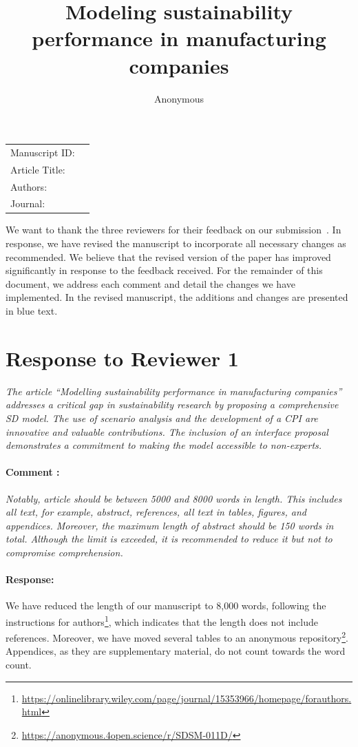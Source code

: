 \documentclass[11pt]{article}
\title{Modeling sustainability performance in manufacturing companies}
\author{Anonymous}
\newcommand{\pid}{}
\newcommand{\jrn}{}
\def\maketitle{
    {\flushleft
    \begin{tabularx}{\dimexpr\textwidth}{lX}
    Manuscript ID:	& \pid \\
    Article Title:	& \thetitle \\
    Authors:		& \theauthor \\
    Journal:		& \jrn \\
    \end{tabularx}}
	\vspace{1em}
}
\newcommand{\ReviewerComment}[1]{\paragraph*{Comment \stepcounter{NumComment}\arabic{NumComment}:} \textit{#1}}
\newcommand{\AuthorResponse}{\paragraph*{Response:}}
\begin{document}
	

	\maketitle
	
    We want to thank the three reviewers for their feedback on our submission~\pid. In response, we have revised the manuscript to incorporate all necessary changes as recommended. We believe that the revised version of the paper has improved significantly in response to the feedback received. For the remainder of this document, we address each comment and detail the changes we have implemented. In the revised manuscript, the additions and changes are presented in blue text.
    
	\hrulefill
	
	\section*{Response to Reviewer 1}
    

    \textit{The article “Modelling sustainability performance in manufacturing companies” addresses a critical gap in sustainability research by proposing a comprehensive SD model. The use of scenario analysis and the development of a CPI are innovative and valuable contributions. The inclusion of an interface proposal demonstrates a commitment to making the model accessible to non-experts.}

    \ReviewerComment{Notably, article should be between 5000 and 8000 words in length. This includes all text, for example, abstract, references, all text in tables, figures, and appendices. Moreover, the maximum length of abstract should be 150 words in total. Although the limit is exceeded, it is recommended to reduce it but not to compromise comprehension.}

    \AuthorResponse{We have reduced the length of our manuscript to 8,000 words, following the instructions for authors\footnote{\label{ft:authors}\url{https://onlinelibrary.wiley.com/page/journal/15353966/homepage/forauthors.html}}, which indicates that the length does not include references. Moreover, we have moved several tables to an anonymous repository\footnote{\label{ft:github}\url{https://anonymous.4open.science/r/SDSM-011D/}}. Appendices, as they are supplementary material, do not count towards the word count.}
\end{document}
